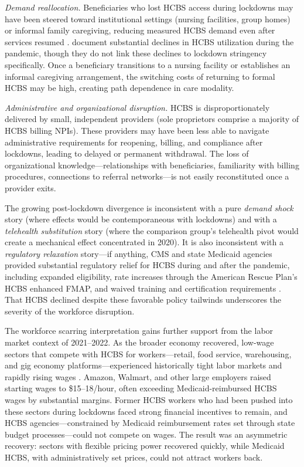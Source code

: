 \documentclass[12pt]{article}
\begin{document}
\textit{Demand reallocation.} Beneficiaries who lost HCBS access during lockdowns may have been steered toward institutional settings (nursing facilities, group homes) or informal family caregiving, reducing measured HCBS demand even after services resumed \citep{wss2020}. \citet{werner2022hcbs} document substantial declines in HCBS utilization during the pandemic, though they do not link these declines to lockdown stringency specifically. Once a beneficiary transitions to a nursing facility or establishes an informal caregiving arrangement, the switching costs of returning to formal HCBS may be high, creating path dependence in care modality.

\textit{Administrative and organizational disruption.} HCBS is disproportionately delivered by small, independent providers (sole proprietors comprise a majority of HCBS billing NPIs). These providers may have been less able to navigate administrative requirements for reopening, billing, and compliance after lockdowns, leading to delayed or permanent withdrawal. The loss of organizational knowledge---relationships with beneficiaries, familiarity with billing procedures, connections to referral networks---is not easily reconstituted once a provider exits.

The growing post-lockdown divergence is inconsistent with a pure \textit{demand shock} story (where effects would be contemporaneous with lockdowns) and with a \textit{telehealth substitution} story (where the comparison group's telehealth pivot would create a mechanical effect concentrated in 2020). It is also inconsistent with a \textit{regulatory relaxation} story---if anything, CMS and state Medicaid agencies provided substantial regulatory relief for HCBS during and after the pandemic, including expanded eligibility, rate increases through the American Rescue Plan's HCBS enhanced FMAP, and waived training and certification requirements \citep{wss2020}. That HCBS declined despite these favorable policy tailwinds underscores the severity of the workforce disruption.

The workforce scarring interpretation gains further support from the labor market context of 2021--2022. As the broader economy recovered, low-wage sectors that compete with HCBS for workers---retail, food service, warehousing, and gig economy platforms---experienced historically tight labor markets and rapidly rising wages \citep{autor2023compression}. Amazon, Walmart, and other large employers raised starting wages to \$15--18/hour, often exceeding Medicaid-reimbursed HCBS wages by substantial margins. Former HCBS workers who had been pushed into these sectors during lockdowns faced strong financial incentives to remain, and HCBS agencies---constrained by Medicaid reimbursement rates set through state budget processes---could not compete on wages. The result was an asymmetric recovery: sectors with flexible pricing power recovered quickly, while Medicaid HCBS, with administratively set prices, could not attract workers back.
\end{document}
